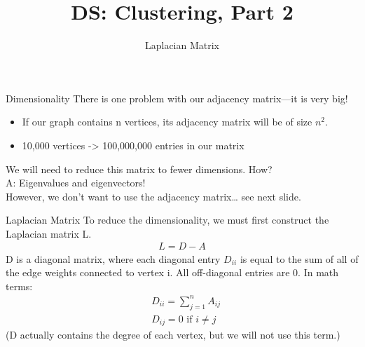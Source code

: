 \documentclass[aspectratio=169]{../latex_main/tntbeamer}  %
\title[Introduction]{DS: Clustering, Part 2}
\subtitle{Laplacian Matrix}
\begin{document}
	
	\maketitle
	\begin{frame}{Dimensionality}
	    There is one problem with our adjacency matrix—it is very big!
	    \begin{itemize}
	        \item If our graph contains n vertices, its adjacency matrix will be of size $n^2$.
	        \item 10,000 vertices -> 100,000,000 entries in our matrix
	    \end{itemize}
	    \bigskip
	    We will need to reduce this matrix to fewer dimensions. How?
	    \\\bigskip
	    A: Eigenvalues and eigenvectors!\\
        However, we don’t want to use the adjacency matrix… see next slide. 
	\end{frame}
	
	
	
	\begin{frame}{Laplacian Matrix}
	    To reduce the dimensionality, we must first construct the Laplacian matrix L.
	    \begin{align*}
	        L=D-A
	    \end{align*}
	    D is a diagonal matrix, where each diagonal entry    $D_{ii}$     is equal to the sum of all of the edge weights connected to vertex i. All off-diagonal entries are 0. In math terms: 
	    \begin{align*}
	        &D_{ii}  =\sum\limits_{j=1}^nA_{ij}\\
	        &D_{ij}  = 0 \text{ if } i\neq j  
	    \end{align*}
	    (D actually contains the degree of each vertex, but we will not use this term.)
	\end{frame}
	
	
	
\end{document}
